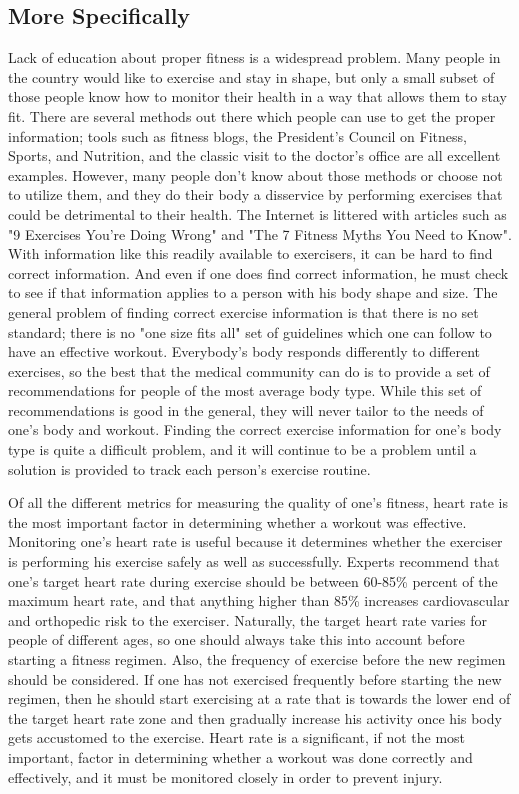 \documentclass[letterpaper,english, 12pt]{scrreprt}
\begin{document}
\subsection{More Specifically}
Lack of education about proper fitness is a widespread problem. Many people in the country would like to exercise and stay in shape, but only a small subset of those people know how to monitor their health in a way that allows them to stay fit. There are several methods out there which people can use to get the proper information; tools such as fitness blogs, the President's Council on Fitness, Sports, and Nutrition, and the classic visit to the doctor's office are all excellent examples. However, many people don't know about those methods or choose not to utilize them, and they do their body a disservice by performing exercises that could be detrimental to their health. The Internet is littered with articles such as "9 Exercises You're Doing Wrong" and "The 7 Fitness Myths You Need to Know". With information like this readily available to exercisers, it can be hard to find correct information. And even if one does find correct information, he must check to see if that information applies to a person with his body shape and size. The general problem of finding correct exercise information is that there is no set standard; there is no "one size fits all" set of guidelines which one can follow to have an effective workout. Everybody's body responds differently to different exercises, so the best that the medical community can do is to provide a set of recommendations for people of the most average body type. While this set of recommendations is good in the general, they will never tailor to the needs of one's body and workout. Finding the correct exercise information for one's body type is quite a difficult problem, and it will continue to be a problem until a solution is provided to track each person's exercise routine.
 
Of all the different metrics for measuring the quality of one's fitness, heart rate is the most important factor in determining whether a workout was effective. Monitoring one's heart rate is useful because it determines whether the exerciser is performing his exercise safely as well as successfully. Experts recommend that one's target heart rate during exercise should be between 60-85\% percent of the maximum heart rate, and that anything higher than 85\% increases cardiovascular and orthopedic risk to the exerciser. Naturally, the target heart rate varies for people of different ages, so one should always take this into account before starting a fitness regimen. Also, the frequency of exercise before the new regimen should be considered. If one has not exercised frequently before starting the new regimen, then he should start exercising at a rate that is towards the lower end of the target heart rate zone and then gradually increase his activity once his body gets accustomed to the exercise. Heart rate is a significant, if not the most important, factor in determining whether a workout was done correctly and effectively, and it must be monitored closely in order to prevent injury.
 
\end{document}

